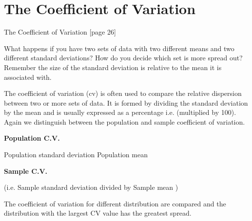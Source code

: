 \section{The Coefficient of Variation }
			
			The Coefficient of Variation [page 26]
			
			What happens if you have two sets of data with two different means and two different standard deviations? How do you decide which set is more spread out? Remember the size of the standard deviation is relative to the mean it is associated with.
			
			The coefficient of variation (cv) is often used to compare the relative dispersion between two or more sets of data. It is formed by dividing the standard deviation by the mean and is usually expressed as a percentage i.e. (multiplied by 100). Again we distinguish between the population and sample coefficient of variation.
			
			
			\textbf{Population C.V.}
			
			
			
			
			Population standard deviation
			Population mean
			
			
			
			
			\textbf{Sample C.V.}
			
			
			
			
			(i.e.     Sample standard deviation divided by Sample mean )
			
			
			The coefficient of variation for different distribution are compared and the distribution with the largest CV value has the greatest spread.
			